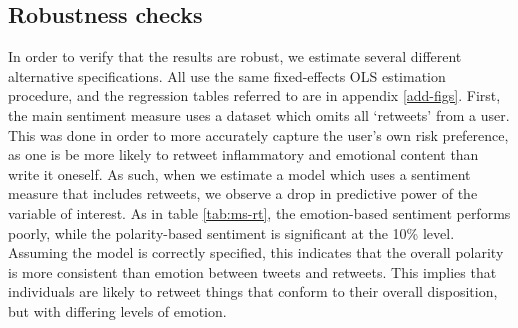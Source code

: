 \documentclass[12pt,a4]{article}
\begin{document}
\subsection{Robustness checks}\label{robust}
In order to verify that the results are robust, we estimate several different alternative specifications. All use the same fixed-effects OLS estimation procedure, and the regression tables referred to are in appendix \ref{add-figs}. First, the main sentiment measure uses a dataset which omits all `retweets' from a user. This was done in order to more accurately capture the user's own risk preference, as one is be more likely to retweet inflammatory and emotional content than write it oneself. As such, when we estimate a model which uses a sentiment measure that includes retweets, we observe a drop in predictive power of the variable of interest. As in table \ref{tab:ms-rt}, the emotion-based sentiment performs poorly, while the polarity-based sentiment is significant at the 10\% level. Assuming the model is correctly specified, this indicates that the overall polarity is more consistent than emotion between tweets and retweets. This implies that individuals are likely to retweet things that conform to their overall disposition, but with differing levels of emotion. 
\end{document}

